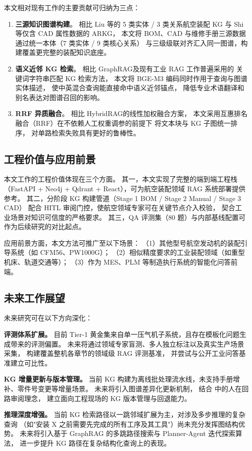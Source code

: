 本文相对现有工作的主要贡献可归纳为三点：

\begin{enumerate}
  \item \textbf{三源知识图谱构建}。
        相比 Liu 等\cite{liu2023avkg}的 5 类实体 / 3 类关系航空装配 KG
        与 Shi 等\cite{shi2022arkg}仅含 CAD 属性数据的 ARKG，
        本文将 BOM、CAD 与维修手册三源数据通过统一本体（7 类实体 / 9 类核心关系）
        与三级级联对齐汇入同一图谱，构建覆盖更完整的装配知识底座。

  \item \textbf{语义近邻 KG 检索}。
        相比 GraphRAG\cite{edge2024graphrag}及现有工业 RAG 工作普遍采用的
        关键词字符串匹配 KG 检索方法，
        本文将 BGE-M3 编码同时作用于查询与图谱实体描述，
        使中英混合查询能直接命中语义近邻锚点，
        降低专业术语翻译和别名表达对图谱召回的影响。

  \item \textbf{RRF 异质融合}。
        相比 HybridRAG\cite{shen2025hybridrag}的线性加权融合方案，
        本文采用互惠排名融合（RRF）在不依赖人工权重调参的前提下
        将文本块与 KG 子图统一排序，
        对单路检索失败具有更好的鲁棒性。
\end{enumerate}

\subsection{工程价值与应用前景}

本文工作的工程价值体现在三个方面。
其一，本文实现了完整的端到端工程栈
（FastAPI + Neo4j + Qdrant + React），可为航空装配领域 RAG 系统部署提供参考。
其二，分阶段 KG 构建管道（Stage 1 BOM / Stage 2 Manual / Stage 3 CAD）
配合 HITL 审阅门控，使航空领域专家可在关键节点介入校验，
契合工业场景对知识可信度的严格要求。
其三，QA 评测集（80 题）与内部基线配置可作为后续研究的对比起点。

应用前景方面，本文方法可推广至以下场景：
（1）其他型号航空发动机的装配引导系统（如 CFM56、PW1000G）；
（2）相似精度要求的工业装配领域（如重型机床、轨道交通等）；
（3）作为 MES、PLM 等制造执行系统的智能化问答前端。

\subsection{未来工作展望}

未来研究可在以下方向深化：

\textbf{评测体系扩展。}
目前 Tier-1 黄金集来自单一压气机子系统，且存在模板化问题生成带来的评测偏置。
未来将通过领域专家盲测、多人独立标注以及真实生产场景采集，
构建覆盖整机各章节的领域级 RAG 评测基准，
并尝试与公开工业问答基准建立可比性。

\textbf{KG 增量更新与版本管理。}
当前 KG 构建为离线批处理流水线，未支持手册增补、零件号变更等增量场景。
未来将引入图谱差异化更新机制，
结合 \cite{amershi2014power} 中的人在回路审阅理念，
建立面向工程现场的 KG 版本管理与回退能力。

\textbf{推理深度增强。}
当前 KG 检索路径以一跳邻域扩展为主，对涉及多步推理的复杂查询
（如"安装 X 之前需要先完成的所有工序及其工具"）尚未充分发挥图结构优势。
未来将引入基于 GraphRAG 的多跳路径搜索与
Planner-Agent 迭代探索算法\cite{shen2025hybridrag}，
进一步提升 KG 路径在复杂结构化查询上的表现。
